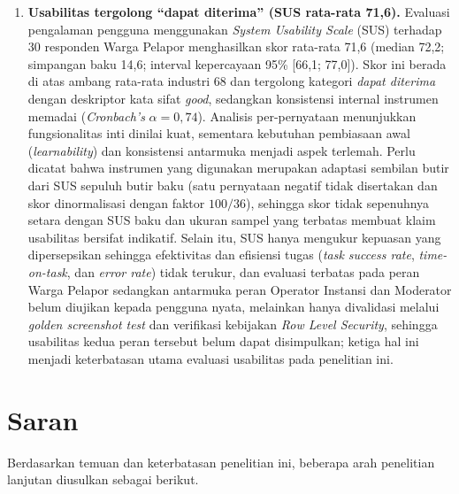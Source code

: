 \begin{enumerate}
    \item \textbf{Usabilitas tergolong ``dapat diterima'' (SUS rata-rata 71,6).} Evaluasi pengalaman pengguna menggunakan \textit{System Usability Scale} (SUS) terhadap 30 responden Warga Pelapor menghasilkan skor rata-rata 71,6 (median 72,2; simpangan baku 14,6; interval kepercayaan 95\% [66,1; 77,0]). Skor ini berada di atas ambang rata-rata industri 68 dan tergolong kategori \textit{dapat diterima} dengan deskriptor kata sifat \textit{good}, sedangkan konsistensi internal instrumen memadai (\textit{Cronbach's} $\alpha = 0{,}74$). Analisis per-pernyataan menunjukkan fungsionalitas inti dinilai kuat, sementara kebutuhan pembiasaan awal (\textit{learnability}) dan konsistensi antarmuka menjadi aspek terlemah. Perlu dicatat bahwa instrumen yang digunakan merupakan adaptasi sembilan butir dari SUS sepuluh butir baku (satu pernyataan negatif tidak disertakan dan skor dinormalisasi dengan faktor $100/36$), sehingga skor tidak sepenuhnya setara dengan SUS baku dan ukuran sampel yang terbatas membuat klaim usabilitas bersifat indikatif. Selain itu, SUS hanya mengukur kepuasan yang dipersepsikan sehingga efektivitas dan efisiensi tugas (\textit{task success rate}, \textit{time-on-task}, dan \textit{error rate}) tidak terukur, dan evaluasi terbatas pada peran Warga Pelapor sedangkan antarmuka peran Operator Instansi dan Moderator belum diujikan kepada pengguna nyata, melainkan hanya divalidasi melalui \textit{golden screenshot test} dan verifikasi kebijakan \textit{Row Level Security}, sehingga usabilitas kedua peran tersebut belum dapat disimpulkan; ketiga hal ini menjadi keterbatasan utama evaluasi usabilitas pada penelitian ini.
\end{enumerate}

\section{Saran}
\label{sec:saran}

Berdasarkan temuan dan keterbatasan penelitian ini, beberapa arah penelitian lanjutan diusulkan sebagai berikut.

